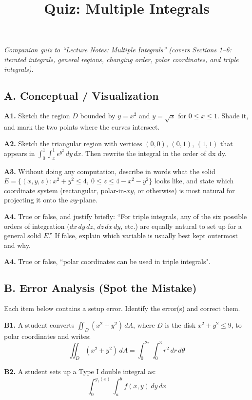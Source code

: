 \documentclass[11pt]{article}
\title{\textbf{Quiz: Multiple Integrals}}
\author{}
\date{}
\begin{document}
\maketitle
\noindent\emph{Companion quiz to ``Lecture Notes: Multiple Integrals'' (covers Sections 1--6: iterated integrals, general regions, changing order, polar coordinates, and triple integrals).}

\subsection*{A. Conceptual / Visualization}

\textbf{A1.} Sketch the region $D$ bounded by $y=x^2$ and $y=\sqrt{x}$ for $0\le x\le 1$. Shade it, and mark the two points where the curves intersect.

\textbf{A2.} Sketch the triangular region with vertices $(0,0)$, $(0,1)$, $(1,1)$ that appears in $\displaystyle\int_0^1\int_x^1 e^{y^2}\, dy\, dx$. Then rewrite the integral in the order of dx dy.

\textbf{A3.} Without doing any computation, describe in words what the solid $E=\{(x,y,z): x^2+y^2\le 4,\ 0\le z\le 4-x^2-y^2\}$ looks like, and state which coordinate system (rectangular, polar-in-$xy$, or otherwise) is most natural for projecting it onto the $xy$-plane.

\textbf{A4.} True or false, and justify briefly: ``For triple integrals, any of the six possible orders of integration ($dx\,dy\,dz$, $dz\,dx\,dy$, etc.) are equally natural to set up for a general solid $E$.'' If false, explain which variable is usually best kept outermost and why.

\textbf{A4.} True or false, ``polar coordinates can be used in triple integrals".

\subsection*{B. Error Analysis (Spot the Mistake)}

Each item below contains a setup error. Identify the error(s) and correct them.

\textbf{B1.} A student converts $\displaystyle\iint_D (x^2+y^2)\, dA$, where $D$ is the disk $x^2+y^2\le 9$, to polar coordinates and writes:
\[
\iint_D (x^2+y^2)\, dA = \int_0^{2\pi}\int_0^3 r^2\, dr\, d\theta
\]

\textbf{B2.} A student sets up a Type I double integral as:
\[
\int_0^{g_1(x)}\int_a^b f(x,y)\, dy\, dx
\]
\end{document}
